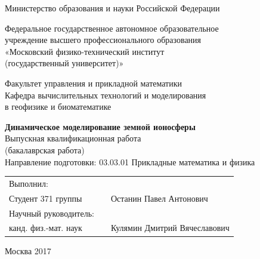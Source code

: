 \documentclass[14pt, a4paper, fleqn]{extarticle}
\begin{document}
\begin{titlepage}

\begin{center}
	Министерство образования и науки Российской Федерации
	
	Федеральное государственное автономное образовательное\\[-6pt]
	учреждение высшего профессионального образования\\[-6pt]
	«Московский физико-технический институт\\[-6pt]
	(государственный университет)»
	
	Факультет управления и прикладной математики\\[-6pt]
	Кафедра вычислительных технологий и моделирования\\[-6pt]
в геофизике и биоматематике\\
\end{center}

\vspace{20mm}

\begin{center}
	{\Large {\bf Динамическое моделирование земной ионосферы\\[8mm] }} 
	Выпускная квалификационная работа \\
	(бакалаврская работа)\\
	Направление подготовки: 03.03.01 Прикладные математика и физика
\end{center}

\vspace{20mm}

\begin{flushleft}
	\begin{tabularx}{\textwidth}{lcl}
		Выполнил: \\
		Студент 371 группы  & \raisebox{-3pt}{\rule{3cm}{0.5pt}} & Останин Павел Антонович \\[5mm]
		
		Научный руководитель:\\
		канд. физ.-мат. наук & \raisebox{-3pt}{\rule{3cm}{0.5pt}} & Кулямин Дмитрий Вячеславович \\[5mm]
	\end{tabularx}
\end{flushleft}

\vfill

\begin{center}
	Москва 2017
\end{center}

\end{titlepage}
\end{document}
